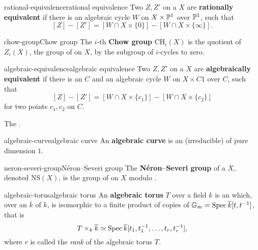 \begin{topic}{rational-equivalence}{rational equivalence}
    Two  $Z, Z'$ on a  $X$ are \textbf{rationally equivalent} if there is an algebraic cycle $W$ on $X \times \mathbb{P}^1$  over $\mathbb{P}^1$, such that
    \[ [Z] - [Z'] = [W \cap X \times \{ 0 \}] - [W \cap X \times \{ \infty \}] . \]
\end{topic}

\begin{topic}{chow-group}{Chow group}
    The $i$-th \textbf{Chow group} $\text{CH}_i(X)$ is the quotient of $Z_i(X)$, the group of  on $X$, by the subgroup of $i$-cycles  to zero.
\end{topic}

\begin{topic}{algebraic-equivalence}{algebraic equivalence}
    Two  $Z, Z'$ on a  $X$ are \textbf{algebraically equivalent} if there is an  $C$ and an algebraic cycle $W$ on $X \times C1$  over $C$, such that
    \[ [Z] - [Z'] = [W \cap X \times \{ c_1 \}] - [W \cap X \times \{ c_2 \}] \]
    for two points $c_1, c_2$ on $C$.
    
    The .
\end{topic}

\begin{topic}{algebraic-curve}{algebraic curve}
    An \textbf{algebraic curve} is an (irreducible)  of pure dimension $1$.
\end{topic}

\begin{topic}{neron-severi-group}{Néron--Severi group}
    The \textbf{Néron--Severi group} of a  $X$, denoted $\text{NS}(X)$, is the group of  on $X$ modulo .
\end{topic}

\begin{topic}{algebraic-torus}{algebraic torus}
    An \textbf{algebraic torus} $T$ over a field $k$ is an  which, over an  $\overline{k}$ of $k$, is isomorphic to a finite product of copies of $\mathbb{G}_m = \operatorname{Spec} \overline{k}[t, t^{-1}]$, that is
    \[ T \times_k \overline{k} \simeq \operatorname{Spec} \overline{k}[t_1, t_1^{-1}, \ldots, t_r, t_r^{-1}] , \]
    where $r$ is called the \textit{rank} of the algebraic torus $T$.
\end{topic}

